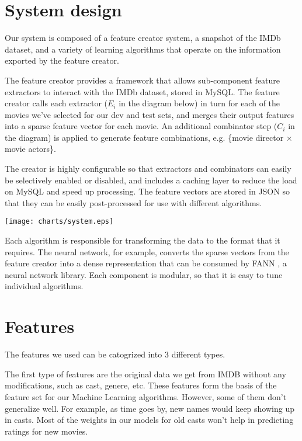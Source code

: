 \documentclass[journal]{IEEEtran}
\begin{document}
\section{System design}
Our system is composed of a feature creator system, a snapshot of the IMDb dataset,
and a variety of learning algorithms that operate on the information exported by
the feature creator.
\par The feature creator provides a framework that allows sub-component
feature extractors to interact with the IMDb dataset, stored in MySQL.  The feature
creator calls each extractor ($E_i$ in the diagram below) in turn for each of the movies we've selected for our
dev and test sets, and merges their output features into a sparse feature vector for
each movie.  An additional combinator step ($C_i$ in the diagram) is applied to generate feature
combinations, e.g. \{movie director $\times$ movie actors\}.
\par The creator is highly configurable so that extractors and combinators can easily be selectively enabled or disabled,
and includes a caching layer to reduce the load on MySQL and speed up processing.
The feature vectors are stored in JSON so that they can be easily
post-processed for use with different algorithms. \\

\begin{center}
    \texttt{[image: charts/system.eps]}
\end{center}

Each algorithm is responsible for transforming the data to the format that it requires.
The neural network, for example, converts the sparse vectors from the feature creator
into a dense representation that can be consumed by FANN \cite{fann}, a neural network library.  Each
component is modular, so that it is easy to tune individual algorithms.


\section{Features}
The features we used can be catogrized into 3 different types.

\par The first type of features are the original data we get from IMDB without any modifications, such as cast, genere, etc. These features form the basis of the feature set for our Machine Learning algorithms. However, some of them don't generalize well. For example, as time goes by, new names would keep showing up in casts. Most of the weights in our models for old casts won't help in predicting ratings for new movies.
\end{document}
